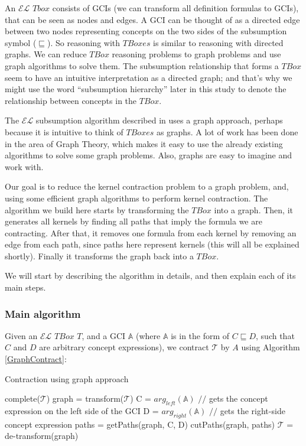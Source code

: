 \documentclass{sfuthesis}
\theoremstyle{plain}
\theoremstyle{definition}
\begin{document}
An $\mathcal{EL}$ $Tbox$ consists of GCIs (we can transform all definition formulas to GCIs), that can be seen as nodes and edges. A GCI can be thought of as a directed edge between two nodes representing concepts on the two sides of the subsumption symbol ($\sqsubseteq$). So reasoning with $TBoxes$ is similar to reasoning with directed graphs. We can reduce $TBox$ reasoning problems to graph problems and use graph algorithms to solve them. The subsumption relationship that forms a $TBox$ seem to have an intuitive interpretation as a directed graph; and that's why we might use the word ``subsumption hierarchy'' later in this study to denote the relationship between concepts in the $TBox$.

The $\mathcal{EL}$ subsumption algorithm described in \cite{small} uses a graph approach, perhaps because it is intuitive to think of $TBoxes$ as graphs. A lot of work has been done in the area of Graph Theory, which makes it easy to use the already existing algorithms to solve some graph problems. Also, graphs are easy to imagine and work with. 

Our goal is to reduce the kernel contraction problem to a graph problem, and, using some efficient graph algorithms to perform kernel contraction. The algorithm we build here starts by transforming the $TBox$ into a graph. Then, it generates all kernels by finding all paths that imply the formula we are contracting. After that, it removes one formula from each kernel by removing an edge from each path, since paths here represent kernels (this will all be explained shortly). Finally it transforms the graph back into a $TBox$. 

We will start by describing the algorithm in details, and then explain each of its main steps. 

\subsubsection{Main algorithm}
Given an $\mathcal{EL}$ $TBox$ $T$, and a GCI $\mathbb{A}$ (where $\mathbb{A}$ is in the form of $C \sqsubseteq D$, such that $C$ and $D$ are arbitrary concept expressions), we contract $\mathcal{T}$ by $A$ using Algorithm \ref{GraphContract}:


\begin{algorithm}
\caption{Contraction using graph approach}
\label{GraphContract}
\begin{algorithmic}[1]
\State complete($ \mathcal{T} $)
\State graph = transform($ \mathcal{T} $)
\State C = $arg_{left}(\mathbb{A})$ $//$ gets the concept expression on the left side of the GCI
\State D = $arg_{right}(\mathbb{A})$ $//$ gets the right-side concept expression
\State paths = getPaths(graph, C, D)
\State cutPaths(graph, paths)
\State $ \mathcal{T} $ = de-transform(graph)
\EndFunction
\end{algorithmic}
\end{algorithm}
\end{document}
